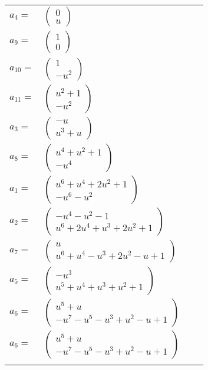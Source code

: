 \documentclass[1p]{elsarticle_modified}
\theoremstyle{definition}
\begin{document}
\begin{tabular}{m{7pt} m{180pt} m{7pt} m{180pt} }
\flushright $a_{4}=$&$\begin{pmatrix}0\\u\end{pmatrix}$ \\
\flushright $a_{9}=$&$\begin{pmatrix}1\\0\end{pmatrix}$ \\
\flushright $a_{10}=$&$\begin{pmatrix}1\\- u^2\end{pmatrix}$ \\
\flushright $a_{11}=$&$\begin{pmatrix}u^2+1\\- u^2\end{pmatrix}$ \\
\flushright $a_{3}=$&$\begin{pmatrix}- u\\u^3+u\end{pmatrix}$ \\
\flushright $a_{8}=$&$\begin{pmatrix}u^4+u^2+1\\- u^4\end{pmatrix}$ \\
\flushright $a_{1}=$&$\begin{pmatrix}u^6+u^4+2 u^2+1\\- u^6- u^2\end{pmatrix}$ \\
\flushright $a_{2}=$&$\begin{pmatrix}- u^4- u^2-1\\u^6+2 u^4+u^3+2 u^2+1\end{pmatrix}$ \\
\flushright $a_{7}=$&$\begin{pmatrix}u\\u^6+u^4- u^3+2 u^2- u+1\end{pmatrix}$ \\
\flushright $a_{5}=$&$\begin{pmatrix}- u^3\\u^5+u^4+u^3+u^2+1\end{pmatrix}$ \\
\flushright $a_{6}=$&$\begin{pmatrix}u^5+u\\- u^7- u^5- u^3+u^2- u+1\end{pmatrix}$\\ \flushright $a_{6}=$&$\begin{pmatrix}u^5+u\\- u^7- u^5- u^3+u^2- u+1\end{pmatrix}$\\&\end{tabular}
\end{document}
